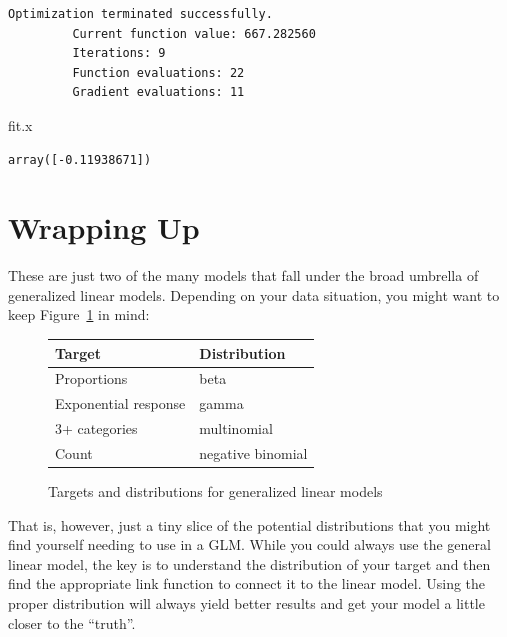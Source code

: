\documentclass[
  letterpaper,
]{krantz}
\newenvironment{Shaded}{}{}
\newcommand{\NormalTok}[1]{#1}
\begin{document}
\begin{verbatim}
Optimization terminated successfully.
         Current function value: 667.282560
         Iterations: 9
         Function evaluations: 22
         Gradient evaluations: 11
\end{verbatim}

\begin{Shaded}
\begin{Highlighting}[]
\NormalTok{fit.x}
\end{Highlighting}
\end{Shaded}

\begin{verbatim}
array([-0.11938671])
\end{verbatim}

\section{Wrapping Up}\label{wrapping-up-1}

These are just two of the many models that fall under the broad umbrella
of generalized linear models. Depending on your data situation, you
might want to keep Figure~\ref{fig-glm-models} in mind:

\begin{figure}

{\centering 

\hypertarget{fig-glm-models-1}{}
\begin{longtable*}{ll}
\toprule
Target & Distribution \\ 
\midrule\addlinespace[2.5pt]
Proportions & beta \\ 
Exponential response & gamma \\ 
3+ categories & multinomial \\ 
Count & negative binomial \\ 
\bottomrule
\end{longtable*}

}

\caption{\label{fig-glm-models}Targets and distributions for generalized
linear models}

\end{figure}

That is, however, just a tiny slice of the potential distributions that
you might find yourself needing to use in a GLM. While you could always
use the general linear model, the key is to understand the distribution
of your target and then find the appropriate link function to connect it
to the linear model. Using the proper distribution will always yield
better results and get your model a little closer to the ``truth''.
\end{document}
